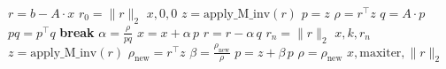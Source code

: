 

\begin{algorithmic}
\State $r = b - A \cdot x$
\State $r_0 = \lVert r \rVert_2$
    \Return $x, 0, 0$
\EndIf
\State $z = \text{apply\_M\_inv}(r)$
\State $p = z$
\State $\rho = r^\top z$
    \State $q = A \cdot p$
    \State $pq = p^\top q$
        \State \textbf{break}
    \EndIf
    \State $\alpha = \frac{\rho}{pq}$
    \State $x = x + \alpha \, p$
    \State $r = r - \alpha \, q$
    \State $r_n = \lVert r \rVert_2$
        \Return $x, k, r_n$
    \EndIf
    \State $z = \text{apply\_M\_inv}(r)$
    \State $\rho_{\text{new}} = r^\top z$
    \State $\beta = \frac{\rho_{\text{new}}}{\rho}$
    \State $p = z + \beta \, p$
    \State $\rho = \rho_{\text{new}}$
\EndFor
\Return $x, \text{maxiter}, \lVert r \rVert_2$
\end{algorithmic}
